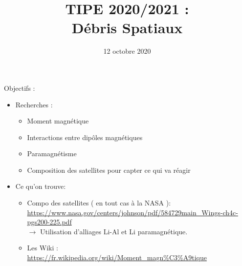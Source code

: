 \documentclass[a4paper,1pt]{article}
\title{TIPE 2020/2021 : \\ Débris Spatiaux}
\date{12 octobre 2020}
\begin{document}
\maketitle

Objectifs :
\begin{itemize}
    \item Recherches : 
    \begin{itemize}
        \item Moment magnétique
        \item Interactions entre dipôles magnétiques
        \item Paramagnétisme
        \item Composition des satellites pour capter ce qui va réagir
    \end{itemize}
    \item Ce qu'on trouve:
    \begin{itemize}
        \item  Compo des satellites ( en tout cas à la NASA ):\\
        \url{https://www.nasa.gov/centers/johnson/pdf/584729main_Wings-ch4c-pgs200-225.pdf}\\
        $\rightarrow$ Utilisation d'alliages Li-Al et Li paramagnétique.
        \item Les Wiki :\\
        \url{https://fr.wikipedia.org/wiki/Moment_magn%C3%A9tique}
    \end{itemize}
       
\end{itemize}
\end{document}
